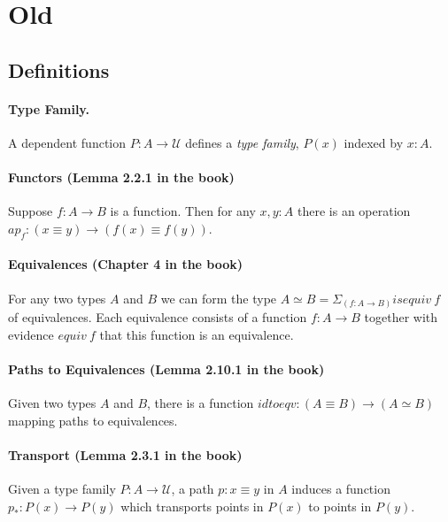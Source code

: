 \documentclass{entcs}
\begin{document}
\section{Old}

\subsection{Definitions}

\paragraph*{Type Family.} A dependent function $P : A \to \mathcal{U}$ defines a
\emph{type family}, $P(x)$ indexed by $x:A$.

\paragraph*{Functors (Lemma 2.2.1 in the book)} Suppose $f : A \to B$ is a
function. Then for any $x,y:A$ there is an operation
$\mathit{ap}_f : (x \equiv y) \to (f(x) \equiv f(y))$.

\paragraph*{Equivalences (Chapter 4 in the book)} For any two types $A$ and $B$
we can form the type $A \simeq B = \Sigma_{(f : A \to B)} \mathit{isequiv}~f$ of
equivalences. Each equivalence consists of a function $f : A \to B$ together
with evidence $\mathit{equiv}~f$ that this function is an equivalence.

\paragraph*{Paths to Equivalences (Lemma 2.10.1 in the book)} Given two types
$A$ and $B$, there is a function
$\mathit{idtoeqv} : (A \equiv B) \to (A \simeq B)$ mapping paths to
equivalences.

\paragraph*{Transport (Lemma 2.3.1 in the book)} Given a type family
$P : A \to \mathcal{U}$, a path $p : x \equiv y$ in $A$ induces a function
$p_* : P(x) \to P(y)$ which transports points in $P(x)$ to points in $P(y)$.
\end{document}
